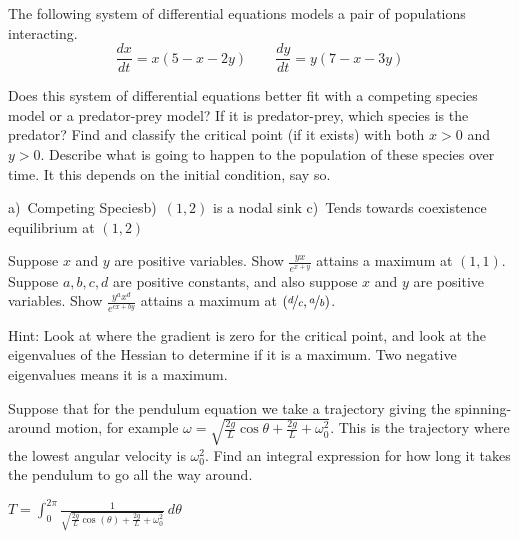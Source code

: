 \begin{exercise}
The following system of differential equations models a pair of populations interacting. 
\[ \frac{dx}{dt} = x(5 - x - 2y)\qquad \frac{dy}{dt} = y(7 - x - 3y) \]
\begin{tasks}
\task Does this system of differential equations better fit with a competing species model or a predator-prey model? If it is predator-prey, which species is the predator?
\task Find and classify the critical point (if it exists) with both $x>0$ and $y>0$.
\task Describe what is going to happen to the population of these species over time. It this depends on the initial condition, say so.
\end{tasks}
\end{exercise}
\comboSol{%
}
{%
a)~Competing Species\quad b)~$(1,2)$ is a nodal sink \quad c)~Tends towards coexistence equilibrium at $(1,2)$
}

\begin{exercise}
\leavevmode
\begin{tasks}
\task Suppose $x$ and $y$ are
positive variables.  Show $\frac{y x}{e^{x+y}}$
attains a maximum at $(1,1)$.
\task Suppose $a,b,c,d$ are positive constants, and also suppose $x$ and $y$ are
positive variables.  Show $\frac{y^a x^d}{e^{cx+by}}$
attains a maximum at $(\nicefrac{d}{c},\nicefrac{a}{b})$.
\end{tasks}
\end{exercise}
\comboSol{%
}
{%
Hint: Look at where the gradient is zero for the critical point, and look at the eigenvalues of the Hessian to determine if it is a maximum. Two negative eigenvalues means it is a maximum.
}

\begin{exercise}
Suppose that for the pendulum equation we take a trajectory giving the
spinning-around motion, for example $\omega = \sqrt{\frac{2g}{L} \cos \theta
+ \frac{2g}{L} + \omega_0^2}$.  This is the trajectory where the lowest
angular velocity is $\omega_0^2$.  Find an integral expression for how long it takes
the pendulum to go all the way around.
\end{exercise}
\comboSol{%
}
{%
$T = \int_0^{2\pi} \frac{1}{\sqrt{\frac{2g}{L}\cos(\theta) + \frac{2g}{L} + \omega_0^2}}\ d\theta$
}


